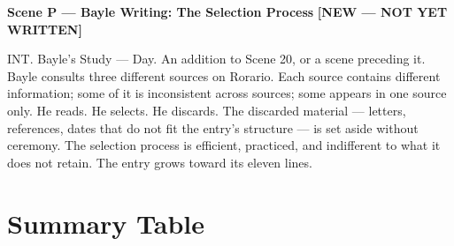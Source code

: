 \documentclass[12pt, oneside]{amsart}
\newcommand{\statusnew}{{\small\bfseries\color{newscene}[NEW --- NOT YET WRITTEN]}}
\begin{document}
\bigskip

\noindent\textbf{Scene P --- Bayle Writing: The Selection Process} \statusnew

\noindent INT. Bayle's Study --- Day. An addition to Scene 20, or a scene preceding it. Bayle consults three different sources on Rorario. Each source contains different information; some of it is inconsistent across sources; some appears in one source only. He reads. He selects. He discards. The discarded material --- letters, references, dates that do not fit the entry's structure --- is set aside without ceremony. The selection process is efficient, practiced, and indifferent to what it does not retain. The entry grows toward its eleven lines.

\section{Summary Table}
\end{document}
